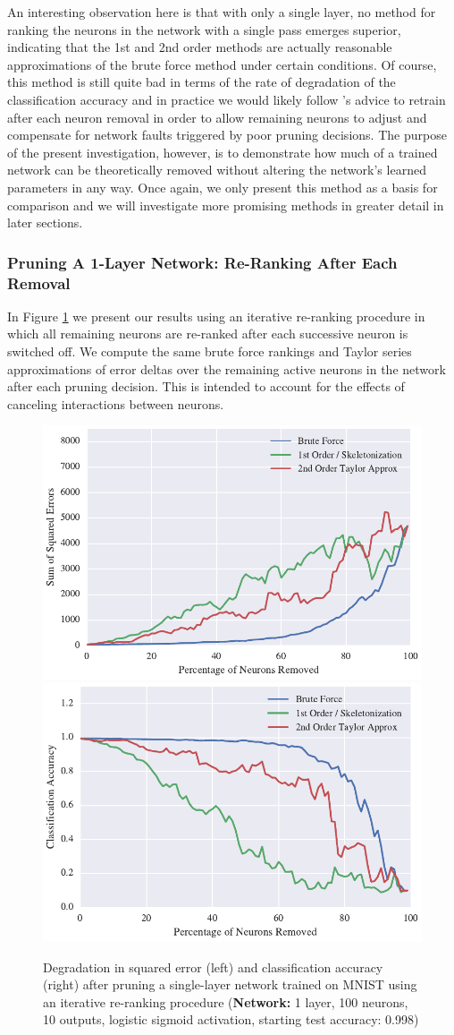 An interesting observation here is that with only a single layer, no method for ranking the neurons in the network with a single pass emerges superior, indicating that the 1st and 2nd order methods are actually reasonable approximations of the brute force method under certain conditions. Of course, this method is still quite bad in terms of the rate of degradation of the classification accuracy and in practice we would likely follow \cite{mozer1989skeletonization}'s advice to retrain after each neuron removal in order to allow remaining neurons to adjust and compensate for network faults triggered by poor pruning decisions. The purpose of the present investigation, however, is to demonstrate how much of a trained network can be theoretically removed without altering the network's learned parameters in any way. Once again, we only present this method as a basis for comparison and we will investigate more promising methods in greater detail in later sections. 

\subsubsection{Pruning A 1-Layer Network: Re-Ranking After Each Removal}
In Figure \ref{fig:mnist-re-ranking-single-layer} we present our results using an iterative re-ranking procedure in which all remaining neurons are re-ranked after each successive neuron is switched off. We compute the same brute force rankings and Taylor series approximations of error deltas over the remaining active neurons in the network after each pruning decision. This is intended to account for the effects of canceling interactions between neurons. 

\begin{figure}[!htb]
\centering
\includegraphics[width=0.49\linewidth]{png/mnist-acc99-iterative-rerank-method.pdf}
\includegraphics[width=0.49\linewidth]{png/mnist-acc99-iterative-rerank-accuracy.pdf}
\caption{Degradation in squared error (left) and classification accuracy (right) after pruning a single-layer network trained on MNIST using an iterative re-ranking procedure (\textbf{Network:} 1 layer, 100 neurons, 10 outputs, logistic sigmoid activation, starting test accuracy: 0.998)}
\label{fig:mnist-re-ranking-single-layer}
\end{figure}


